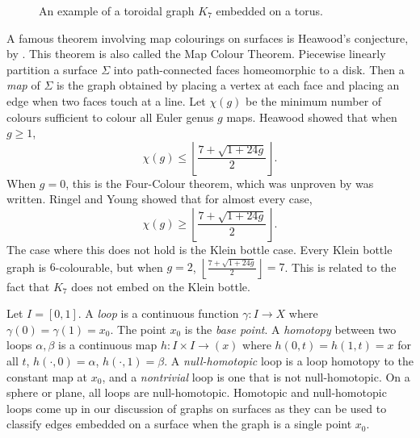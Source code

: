 \begin{figure}[h!]
	\centering
	
	\caption[Toroidal graph]{An example of a toroidal graph $K_7$ embedded on a torus.}\label{fig:k7_on_torus}
\end{figure}

A famous theorem involving map colourings on surfaces is Heawood's conjecture, by \textcite{heawoodMapcolourTheorem1890}. This theorem is also called the Map Colour Theorem. Piecewise linearly partition a surface $\Sigma$ into path-connected faces homeomorphic to a disk. Then a \textit{map} of $\Sigma$ is the graph obtained by placing a vertex at each face and placing an edge when two faces touch at a line. Let $\chi(g)$ be the minimum number of colours sufficient to colour all Euler genus $g$ maps. Heawood showed that when $g \geq 1$, 
	\begin{equation*}
		\chi(g) \leq \left\lfloor 
		\frac{7 + \sqrt{1 + 24g}}{2}
		\right\rfloor.
	\end{equation*}
When $g = 0$, this is the Four-Colour theorem, which was unproven  by \textcite{ringelMapColorTheorem1974} was written.  
Ringel and Young \cite{ringelMapColorTheorem1974} showed that for almost every case,
\begin{equation*}
	\chi(g) \geq \left\lfloor 
	\frac{7 + \sqrt{1 + 24g}}{2}
	\right\rfloor.
\end{equation*}
The case where this does not hold is the Klein bottle case. Every Klein bottle graph is $6$-colourable, but when $g = 2$, $\left\lfloor 
\frac{7 + \sqrt{1 + 24g}}{2}
\right\rfloor = 7$. This is related to the fact that $K_7$ does not embed on the Klein bottle. 

Let $I = [0, 1]$.
A \textit{loop} is a continuous function $\gamma : I \rightarrow X$ where $\gamma(0) = \gamma(1) = x_0$. The point $x_0$ is the \textit{base point}. A \textit{homotopy} between two loops $\alpha, \beta$ is a continuous map $h : I \times I \rightarrow (x)$ where $h(0, t) = h(1, t) = x$ for all $t$, $h(\cdot, 0) = \alpha$, $h(\cdot, 1) = \beta$. A \textit{null-homotopic} loop is a loop homotopy to the constant map at $x_0$, and a \textit{nontrivial} loop is one that is not null-homotopic. On a sphere or plane, all loops are null-homotopic. Homotopic and null-homotopic loops come up in our discussion of graphs on surfaces as they can be used to classify edges embedded on a surface when the graph is a single point $x_0$. 
